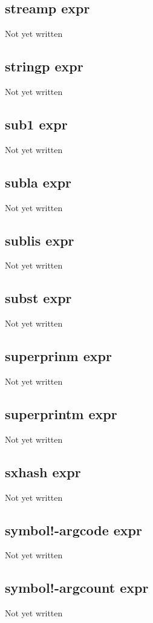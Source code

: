 \documentclass[a4paper,11pt]{article}
\begin{document}
{\subsection{\ttfamily streamp expr}
Not yet written

\subsection{\ttfamily stringp expr}
Not yet written

\subsection{\ttfamily sub1 expr}
Not yet written

\subsection{\ttfamily subla expr}
Not yet written

\subsection{\ttfamily sublis expr}
Not yet written

\subsection{\ttfamily subst expr}
Not yet written

\subsection{\ttfamily superprinm expr}
Not yet written

\subsection{\ttfamily superprintm expr}
Not yet written

\subsection{\ttfamily sxhash expr}
Not yet written

\subsection{\ttfamily symbol!-argcode expr}
Not yet written

\subsection{\ttfamily symbol!-argcount expr}
Not yet written

}
\end{document}
